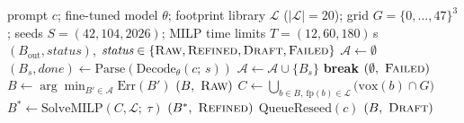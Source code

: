 \begin{algorithm}[tb]
\caption{BrickForma inference and refinement}
\label{alg:inference-refinement}
\small\raggedright
\begin{algorithmic}[1]
\REQUIRE prompt $c$; fine-tuned model $\theta$; footprint library $\mathcal{L}$ ($|\mathcal{L}|{=}20$); grid $G{=}\{0,\dots,47\}^3$; seeds $S{=}(42,104,2026)$; MILP time limits $T{=}(12,60,180)$\,s
\ENSURE $(B_{\mathrm{out}},\textit{status})$, $\textit{status}\in\{\textsc{Raw},\textsc{Refined},\textsc{Draft},\textsc{Failed}\}$
\STATE $\mathcal{A} \gets \emptyset$ 
  \STATE $(B_s,\textit{done}) \gets \mathrm{Parse}(\mathrm{Decode}_{\theta}(c;\, s))$
    \STATE $\mathcal{A} \gets \mathcal{A} \cup \{B_s\}$
      \STATE \textbf{break} 
    \ENDIF
  \ENDIF
\ENDFOR
{}
  \RETURN $(\emptyset,\ \textsc{Failed})$ 
\ENDIF
\STATE $B \gets \arg\min_{B' \in \mathcal{A}} \mathrm{Err}(B')$
  \RETURN $(B,\ \textsc{Raw})$ 
\ENDIF
\STATE $C \gets \bigcup_{b \in B,\ \mathrm{fp}(b)\in\mathcal{L}} \bigl(\mathrm{vox}(b) \cap G\bigr)$ 
  \STATE $B^{*} \gets \mathrm{SolveMILP}(C,\mathcal{L};\ \tau)$ 
    \RETURN $(B^{*},\ \textsc{Refined})$
  \ENDIF
\ENDFOR
\STATE $\mathrm{QueueReseed}(c)$ 
\RETURN $(B,\ \textsc{Draft})$ 
\end{algorithmic}
\end{algorithm}
